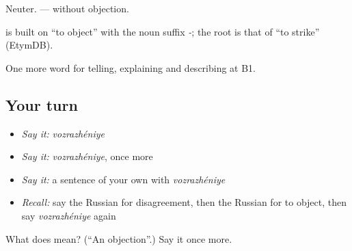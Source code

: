 Neuter. \emph{ } — without objection.

\begin{cousinweb}
\textbf{} is built on \emph{} \textquotedblleft{}to object\textquotedblright{} with the noun suffix \emph{-}; the root is that of \emph{} \textquotedblleft{}to strike\textquotedblright{} (EtymDB).
\end{cousinweb}

\begin{grammarlens}[title={What you've built}]
One more word for telling, explaining and describing at B1.
\end{grammarlens}

\subsection*{Your turn}
\begin{itemize}
\raggedright
  \item \emph{Say it:} \emph{vozrazhéniye}
  \item \emph{Say it:} \emph{vozrazhéniye}, once more
  \item \emph{Say it:} a sentence of your own with \emph{vozrazhéniye}
  \item \emph{Recall:} say the Russian for disagreement, then the Russian for to object, then say \emph{vozrazhéniye} again
\end{itemize}

\begin{tcolorbox}[breakable,colback=teal!4,colframe=teal!35!black,title={Before you move on}]
What does  mean? (\textquotedblleft{}An objection\textquotedblright{}.) Say it once more.
\end{tcolorbox}
